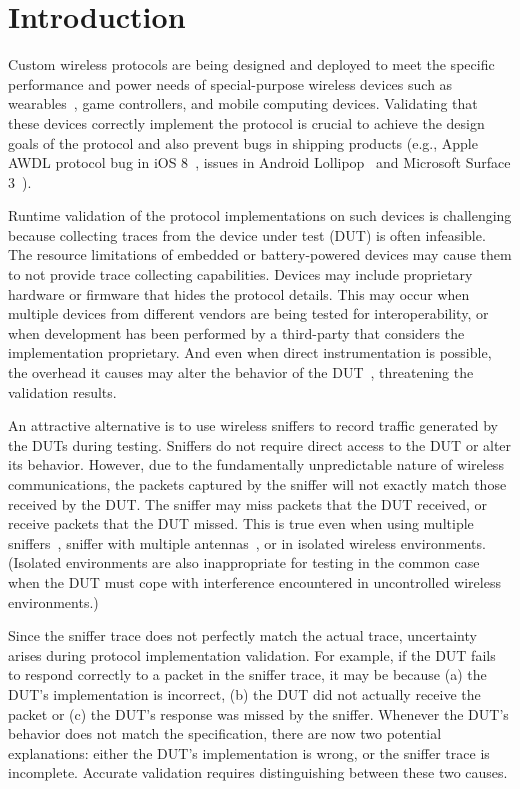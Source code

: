 
\section{Introduction}
\label{sec:intro}

Custom wireless protocols are being designed and deployed to meet the specific
performance and power needs of special-purpose wireless devices such as
wearables~\cite{iris}, game controllers, and mobile computing devices.
Validating that these devices correctly implement the protocol is crucial to
achieve the design goals of the protocol and also prevent bugs in shipping
products (e.g., Apple AWDL protocol bug in iOS 8~\cite{wifried}, \wifi{} issues
in Android Lollipop~\cite{lollipop} and Microsoft Surface 3~\cite{surface}).


Runtime validation of the protocol implementations on such devices is challenging
because collecting traces from the device under test (DUT) is often
infeasible.
The resource limitations of embedded or battery-powered devices may cause them
to not provide trace collecting capabilities.
Devices may include proprietary hardware or firmware that hides the protocol
details.
This may occur when multiple devices from different vendors are being tested
for interoperability, or when development has been performed by a third-party
that considers the implementation proprietary.
And even when direct instrumentation is possible, the overhead it causes may alter
the behavior of the DUT~\cite{mytkowicz2008observer}, threatening the validation
results.

An attractive alternative is to use wireless
sniffers to record traffic generated by the DUTs during testing.
Sniffers do not require direct access to the DUT or alter its behavior.
However, due to the fundamentally unpredictable nature of wireless
communications, the packets captured by the sniffer will not exactly match
those received by the DUT.
The sniffer may miss packets that the DUT received, or receive packets that
the DUT missed.
This is true even when using multiple
sniffers~\cite{cheng2006jigsaw,mahajan2006analyzing,bahl2006enhancing}, sniffer
with multiple antennas~\cite{omnipeek}, or in isolated wireless environments.
(Isolated environments are also inappropriate for testing in the common case
when the DUT must cope with interference encountered in uncontrolled wireless
environments.)

Since the sniffer trace does not perfectly match the actual trace,
uncertainty arises during protocol implementation validation.
For example, if the DUT fails to respond correctly to a packet in the sniffer
trace, it may be because (a) the DUT's implementation is incorrect, (b) the DUT
did not actually receive the packet or (c) the DUT's response was missed by the
sniffer.
Whenever the DUT's behavior does not match the specification, there are now two
potential explanations:
either the DUT's implementation is wrong, or the sniffer trace is incomplete.
Accurate validation requires  distinguishing between these two
causes.

